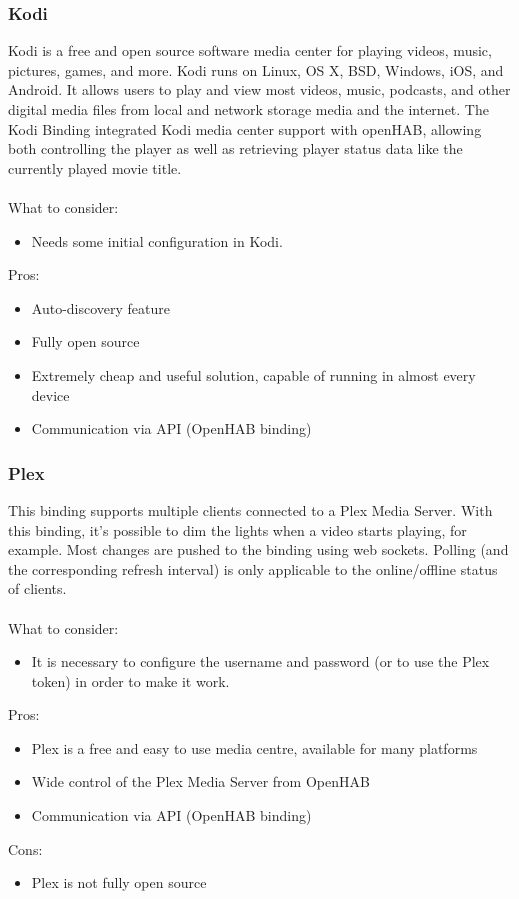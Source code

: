 \subsubsection{Kodi}
Kodi is a free and open source software media center for playing videos, music, pictures, games, and more. Kodi runs on Linux, OS X,
BSD, Windows, iOS, and Android. It allows users to play and view most videos, music, podcasts, and other digital media files from local
and network storage media and the internet.
The Kodi Binding integrated Kodi media center support with openHAB, allowing both controlling the player as well as retrieving player
status data like the currently played movie title.\\~\\
What to consider:
\begin{itemize}
	\item Needs some initial configuration in Kodi.
\end{itemize}
Pros:
\begin{itemize}
	\item Auto-discovery feature
	\item Fully open source
	\item Extremely cheap and useful solution, capable of running in almost every device
	\item Communication via API (OpenHAB binding)
\end{itemize}

\subsubsection{Plex}
This binding supports multiple clients connected to a Plex Media Server. With this binding, it’s possible to dim the lights when a video
starts playing, for example.
Most changes are pushed to the binding using web sockets. Polling (and the corresponding refresh interval) is only applicable to the
online/offline status of clients.\\~\\
What to consider:
\begin{itemize}
	\item It is necessary to configure the username and password (or to use the Plex token) in order to make it work.
\end{itemize}
Pros:
\begin{itemize}
	\item Plex is a free and easy to use media centre, available for many platforms
	\item Wide control of the Plex Media Server from OpenHAB
	\item Communication via API (OpenHAB binding)
\end{itemize}
Cons:
\begin{itemize}
	\item Plex is not fully open source
\end{itemize}

